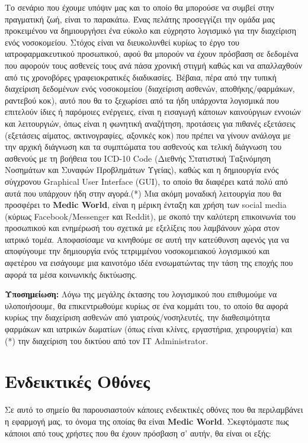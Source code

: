 \documentclass{article}
\begin{document}
Το σενάριο που έχουμε υπόψιν μας και το οποίο θα μπορούσε να συμβεί στην πραγματική ζωή, είναι το παρακάτω. Ένας πελάτης προσεγγίζει την ομάδα μας προκειμένου να δημιουργήσει ένα εύκολο και εύχρηστο λογισμικό για την διαχείριση ενός νοσοκομείου. Στόχος είναι να διευκολυνθεί κυρίως το έργο του ιατροφαρμακευτικού προσωπικού, αφού θα μπορούν να έχουν πρόσβαση σε δεδομένα που αφορούν τους ασθενείς τους ανά πάσα χρονική στιγμή καθώς και να απαλλαχθούν από τις χρονοβόρες γραφειοκρατικές διαδικασίες. Βέβαια, πέρα από την τυπική διαχείριση δεδομένων ενός νοσοκομείου (διαχείριση ασθενών, αποθήκης/φαρμάκων, ραντεβού κοκ), αυτό που θα το ξεχωρίσει από τα ήδη υπάρχοντα λογισμικά που επιτελούν ίδιες ή παρόμοιες ενέργειες, είναι η εισαγωγή κάποιων καινούργιων εννοιών και λειτουργιών, όπως είναι η φωνητική αναζήτηση, προτάσεις για πιθανές εξετάσεις (εξετάσεις αίματος, ακτινογραφίες, αξονικές κοκ) που πρέπει να γίνουν ανάλογα με την αρχική διάγνωση και τα συμπτώματα του ασθενούς και τελική διάγνωση του ασθενούς με τη βοήθεια του ICD-10 Code (Διεθνής Στατιστική Ταξινόμηση Νοσημάτων και Συναφών Προβλημάτων Υγείας), καθώς και η δημιουργία ενός σύγχρονου Graphical User Interface (GUI), το οποίο θα διαφέρει κατά πολύ από αυτά που υπάρχουν ήδη στην αγορά.(*) Μια ακόμη μοναδική λειτουργία που θα προσφέρει το \textbf{Medic World}, είναι η μέρικη ένταξη και χρήση των social media (κύριως Facebook/Messenger και Reddit), με σκοπό την καλύτερη επικοινωνία του προσωπικού και ενημέρωσή του σχετικά με εξελίξεις που λαμβάνουν χώρα στον ιατρικό τομέα. Αποφασίσαμε να κινηθούμε σε αυτή την κατεύθυνση αφενός για να αποφύγουμε την δημιουργία ενός τετριμμένου νοσοκομειακού λογισμικού και αφετέρου να εισάγουμε μια καινοτόμο ιδέα ενσωματώντας την τάση της εποχής που αφορά τα μέσα κοινωνικής δικτύωσης.
\newline \par
\textbf{Υποσημείωση:} Λόγω της μεγάλης έκτασης του λογισμικού που επιθυμούμε να υλοποιήσουμε, θα επικεντρωθούμε κυρίως σε ένα κομμάτι του, το οποίο θα αφορά κυρίως την διαχείριση ασθενών από γιατρούς/νοσηλευτές, την διαθεσιμότητα φαρμάκων και ιατρικών δωματίων (όπως είναι κλίνες, εργαστήρια, χειρουργεία) και (*) την διαχείριση του δικτύου από τον IT Administrator.


\section{Ενδεικτικές Οθόνες}

Σε αυτό το σημείο θα παρουσιαστούν κάποιες ενδεικτικές οθόνες που θα περιλαμβάνει η εφαρμογή μας, το όνομα της οποίας θα είναι \textbf{Medic World}. Σκεφτόμαστε πως κάποιοι από τους χρήστες που θα έχουν πρόσβαση σ' αυτήν, θα είναι οι εξής:
\end{document}

